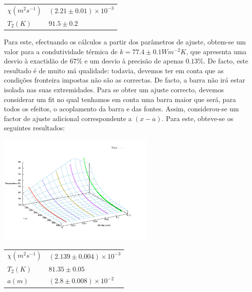 \documentclass[8pt]{extarticle}
\begin{document}
\begin{multicols}{2}
{\small
\begin{center}
\begin{tabular}{ x{2.5cm} x{2.5cm} } 
\hline \hline
$\chi(m^{2}s^{-1})$ & $(2.21\pm0.01)\times10^{-3}$ \tabularnewline
$T_2(K)$  & $91.5\pm0.2$ \tabularnewline
\hline \hline
\end{tabular}
\par{}
\end{center}
}

\par Para este, efectuando os cálculos a partir dos parâmetros de ajuste, obtem-se um valor para a condutividade térmica de $k=77.4\pm0.1 Wm^{-2}K$, que apresenta uma desvio à exactidão de $67\%$ e um desvio à precisão de apenas $0.13\%$. De facto, este resultado é de muito má qualidade: todavia, devemos ter em conta que as condições fronteira impostas não são as correctas. De facto, a barra não irá estar isolada nas suas extremidades. Para se obter um ajuste correcto, devemos considerar um fit no qual tenhamos em conta uma barra maior que será, para todos os efeitos, o acoplamento da barra e das fontes. Assim, considerou-se um factor de ajuste adicional correspondente a $(x-a)$. Para este, obteve-se os seguintes resultados:

\begin{center}
\includegraphics[width=220pt]{trans_ajustado.pdf}
\par{}
\end{center}

{\small
\begin{center}
\begin{tabular}{ x{3cm} x{3cm}} 
\hline \hline
$\chi(m^{2}s^{-1})$ & $(2.139\pm0.004)\times10^{-3}$ \tabularnewline
$T_2(K)$ & $81.35\pm0.05$ \tabularnewline $a(m)$ & $(2.8\pm0.008)\times10^{-2}$ \tabularnewline
\hline \hline
\end{tabular}
\par{}
\end{center}
}


\end{multicols}
\end{document}
